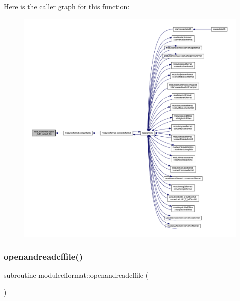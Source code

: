 Here is the caller graph for this function\+:\nopagebreak
\begin{figure}[H]
\begin{center}
\leavevmode
\includegraphics[width=350pt]{namespacemodulecfformat_ac77aa80bb4743d920e0a70e5b278be5d_icgraph}
\end{center}
\end{figure}
\mbox{\label{namespacemodulecfformat_a5052b284bceadda6143b8eb5cfd48d05}} 
\subsubsection{\texorpdfstring{openandreadcffile()}{openandreadcffile()}}
{\footnotesize\ttfamily subroutine modulecfformat\+::openandreadcffile (\begin{DoxyParamCaption}{ }\end{DoxyParamCaption})\hspace{0.3cm}{\ttfamily [private]}}

